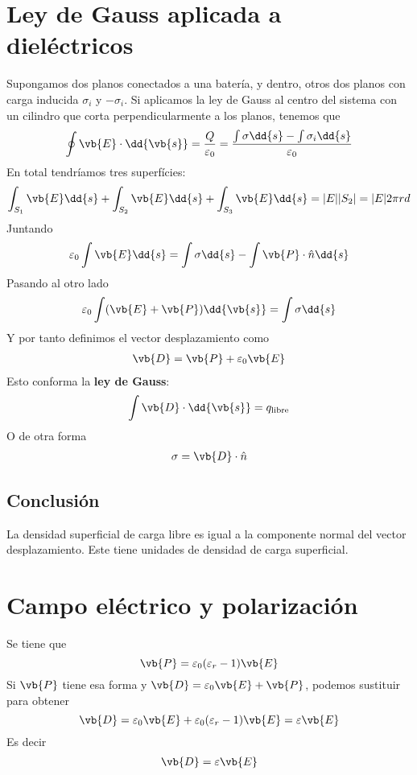 \documentclass{./FisicaII.tex}
\begin{document}
\section{Ley de Gauss aplicada a dieléctricos}
Supongamos dos planos conectados a una batería, y dentro, otros dos planos con carga
inducida \(\sigma _{i}\) y \(-\sigma _{i}\). Si aplicamos la ley de Gauss al centro del
sistema con un cilindro que corta perpendicularmente a los planos, tenemos que
\[
	\oint \vb{E} \cdot \dd{\vb{s}} = \frac{Q}{\varepsilon_{0}} = 
	\frac{\int \sigma  \dd{s} - \int \sigma _{i}\dd{s}}{\varepsilon _{0}}
\]
En total tendríamos tres superfícies:
\[
	\int_{S_{1}} \vb{E} \dd{s} + \int_{S_{2}} \vb{E}\dd{s} + \int_{S_{3}}\vb{E}\dd{s}
	= |E||S_{2}| = |E|2 \pi r d
\]
Juntando
\[
	\varepsilon _{0} \int \vb{E} \dd{s} = \int \sigma \dd{s} - \int \vb{P} \cdot \hat{n}\dd{s}
\]
Pasando al otro lado
\[
	\varepsilon _{0} \int (\vb{E}+\vb{P} )\dd{\vb{s}} = \int \sigma \dd{s}
\]
Y por tanto definimos el vector desplazamiento como
\begin{equation}
	\begin{split}
		\vb{D} = \vb{P} + \varepsilon _{0} \vb{E}
	\end{split}
\end{equation}
Esto conforma la \textbf{ley de Gauss}:
\begin{equation}
	\begin{split}
		\int \vb{D} \cdot \dd{\vb{s}} = q_{\text{libre}}
	\end{split}
\end{equation}
O de otra forma
\begin{equation}
	\begin{split}
		\sigma = \vb{D} \cdot \hat{n}
	\end{split}
\end{equation}
\subsection{Conclusión}
La densidad superficial de carga libre es igual a la componente normal del vector
desplazamiento. Este tiene unidades de densidad de carga superficial.
\section{Campo eléctrico y polarización}
Se tiene que
\[
	\vb{P} = \varepsilon _{0}(\varepsilon _{r}-1) \vb{E}
\]
Si \(\vb{P}\) tiene esa forma y \(\vb{D} = \varepsilon_{0}\vb{E} + \vb{P}\), podemos
sustituir para obtener
\[
	\vb{D} = \varepsilon _{0}\vb{E} + \varepsilon _{0}(\varepsilon _{r}-1)\vb{E}=
	\varepsilon  \vb{E}
\]
Es decir
\begin{equation}
	\begin{split}
		\vb{D} = \varepsilon \vb{E}
	\end{split}
\end{equation}
\end{document}
